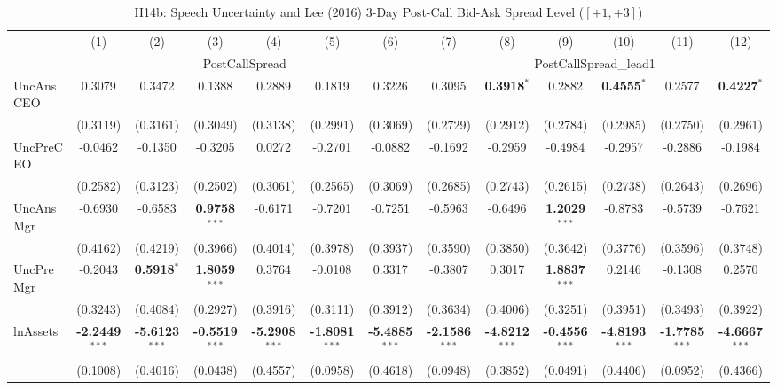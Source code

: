 \documentclass[11pt,a4paper]{article}
\begin{document}
\clearpage
\begin{table}[htbp]
\centering
\caption{H14b: Speech Uncertainty and Lee (2016) 3-Day Post-Call Bid-Ask Spread Level ($[+1,+3]$)}
\label{tab:h14b}
\scriptsize
\begin{tabular}{lcccccccccccc}
\toprule
 & (1) & (2) & (3) & (4) & (5) & (6) & (7) & (8) & (9) & (10) & (11) & (12) \\
 & \multicolumn{6}{c}{PostCallSpread} & \multicolumn{6}{c}{PostCallSpread\_lead1} \\
\cmidrule(lr){2-7} \cmidrule(lr){8-13}
\midrule
UncAnsCEO & 0.3079 & 0.3472 & 0.1388 & 0.2889 & 0.1819 & 0.3226 & 0.3095 & \textbf{0.3918}$^{*}$ & 0.2882 & \textbf{0.4555}$^{*}$ & 0.2577 & \textbf{0.4227}$^{*}$ \\
 & (0.3119) & (0.3161) & (0.3049) & (0.3138) & (0.2991) & (0.3069) & (0.2729) & (0.2912) & (0.2784) & (0.2985) & (0.2750) & (0.2961) \\
UncPreCEO & -0.0462 & -0.1350 & -0.3205 & 0.0272 & -0.2701 & -0.0882 & -0.1692 & -0.2959 & -0.4984 & -0.2957 & -0.2886 & -0.1984 \\
 & (0.2582) & (0.3123) & (0.2502) & (0.3061) & (0.2565) & (0.3069) & (0.2685) & (0.2743) & (0.2615) & (0.2738) & (0.2643) & (0.2696) \\
UncAnsMgr & -0.6930 & -0.6583 & \textbf{0.9758}$^{***}$ & -0.6171 & -0.7201 & -0.7251 & -0.5963 & -0.6496 & \textbf{1.2029}$^{***}$ & -0.8783 & -0.5739 & -0.7621 \\
 & (0.4162) & (0.4219) & (0.3966) & (0.4014) & (0.3978) & (0.3937) & (0.3590) & (0.3850) & (0.3642) & (0.3776) & (0.3596) & (0.3748) \\
UncPreMgr & -0.2043 & \textbf{0.5918}$^{*}$ & \textbf{1.8059}$^{***}$ & 0.3764 & -0.0108 & 0.3317 & -0.3807 & 0.3017 & \textbf{1.8837}$^{***}$ & 0.2146 & -0.1308 & 0.2570 \\
 & (0.3243) & (0.4084) & (0.2927) & (0.3916) & (0.3111) & (0.3912) & (0.3634) & (0.4006) & (0.3251) & (0.3951) & (0.3493) & (0.3922) \\
\midrule
lnAssets & \textbf{-2.2449}$^{***}$ & \textbf{-5.6123}$^{***}$ & \textbf{-0.5519}$^{***}$ & \textbf{-5.2908}$^{***}$ & \textbf{-1.8081}$^{***}$ & \textbf{-5.4885}$^{***}$ & \textbf{-2.1586}$^{***}$ & \textbf{-4.8212}$^{***}$ & \textbf{-0.4556}$^{***}$ & \textbf{-4.8193}$^{***}$ & \textbf{-1.7785}$^{***}$ & \textbf{-4.6667}$^{***}$ \\
 & (0.1008) & (0.4016) & (0.0438) & (0.4557) & (0.0958) & (0.4618) & (0.0948) & (0.3852) & (0.0491) & (0.4406) & (0.0952) & (0.4366) \\

\end{tabular}
\end{table}
\end{document}
